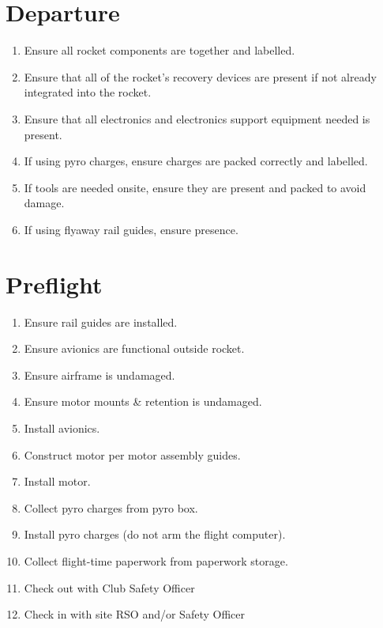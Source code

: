 \documentclass[12pt]{article}
\begin{document}
\section{Departure}
\begin{addmargin}[3em]{3em}
	\begin{enumerate}[label=\thesection.\arabic*\quad$\square$]
		\item Ensure all rocket components are together and labelled.
		\item Ensure that all of the rocket's recovery devices are present if not already integrated into the rocket.
		\item Ensure that all electronics and electronics support equipment needed is present.
		\item If using pyro charges, ensure charges are packed correctly and labelled.
		\item If tools are needed onsite, ensure they are present and packed to avoid damage.
		\item If using flyaway rail guides, ensure presence.
	\end{enumerate}
\end{addmargin}
\section{Preflight}
\begin{addmargin}[3em]{3em}
	\begin{enumerate}[label=\thesection.\arabic*\quad$\square$]
		\item Ensure rail guides are installed.
		\item Ensure avionics are functional outside rocket. 
		\item Ensure airframe is undamaged.
		\item Ensure motor mounts \& retention is undamaged.
		\item Install avionics.
		\item Construct motor per motor assembly guides.
		\item Install motor.
		\item Collect pyro charges from pyro box.
		\item Install pyro charges (do not arm the flight computer).
		\item Collect flight-time paperwork from paperwork storage.
		\item Check out with Club Safety Officer
		\item Check in with site RSO and/or Safety Officer
	\end{enumerate}
\end{addmargin}
\end{document}
